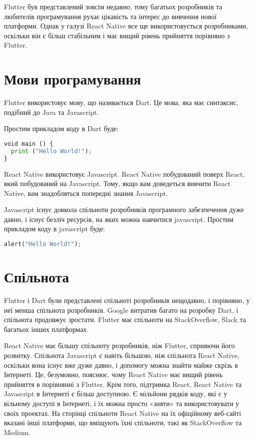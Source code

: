 Flutter був представлений зовсім недавно, тому багатьох розробників та любителів програмування рухає цікавість та інтерес до вивчення нової платформи.
Однак у галузі React Native все ще використовується розробниками, оскільки він є більш стабільним і має вищий рівень прийняття порівняно з Flutter.

\section{Мови програмування}\label{section.1.3}

Flutter використовує мову, що називається Dart. 
Це мова, яка має синтаксис, подібний до Java та Javascript.

Простим прикладом коду в Dart буде:
\begin{lstlisting}[style=light, language=Python,label={lst:vectorimg},caption=Dart Hello World]
void main () { 
  print ("Hello World!"); 
}
\end{lstlisting}

React Native використовує Javascript.
React Native побудований поверх React, який побудований на Javascript.
Тому, якщо вам доведеться вивчити React Native, вам знадобляться попередні знання Javascript.

Javascript існує довкола спільноти розробників програмного забезпечення дуже давно, і існує безліч ресурсів, на яких можна навчитися javascript.
Простим прикладом коду в javascript буде:

\begin{lstlisting}[style=light, language=Python,label={lst:vectorimg},caption=Dart Hello World]
  alert("Hello World!");
\end{lstlisting}

\section{Спільнота}\label{section.1.4}

Flutter і Dart були представлені спільноті розробників нещодавно, і порівняно, у неї менша спільнота розробників.
Google витратив багато на розробку Dart, і спільнота продовжує зростати.
Flutter має спільноти на StackOverflow, Slack та багатьох інших платформах.

React Native має більшу спільноту розробників, ніж Flutter, сприяючи його розвитку.
Спільнота Javascript є навіть більшою, ніж спільнота React Native, оскільки вона існує вже дуже давно, і допомогу можна знайти майже скрізь в Інтернеті.
Це, безумовно, пояснює, чому React Native має вищий рівень прийняття в порівнянні з Flutter.
Крім того, підтримка React, React Native та Javascript в Інтернеті є більш доступною.
Є мільйони рядків коду, які є у вільному доступі в Інтернеті, і їх можна просто «зняти» та використовувати у своїх проектах.
На сторінці спільноти React Native на їх офіційному веб-сайті вказані інші платформи, що вміщують їхні спільноти, такі як StackOverflow та Medium.

